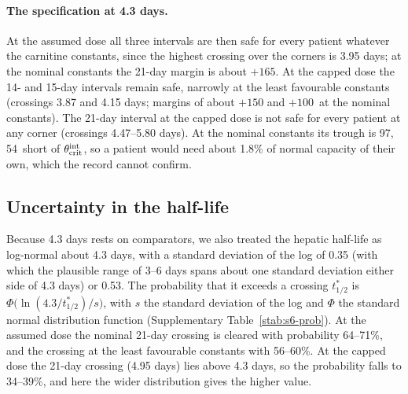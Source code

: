 \paragraph{The specification at 4.3 days.} At the assumed dose all three intervals are then safe
for every patient whatever the carnitine constants, since the highest crossing over the corners
is 3.95 days; at the nominal constants the 21-day margin is about $+165$\um. At the capped dose
the 14- and 15-day intervals remain safe, narrowly at the least favourable constants (crossings
3.87 and 4.15 days; margins of about $+150$ and $+100$\um\ at the nominal constants). The 21-day
interval at the capped dose is not safe for every patient at any corner (crossings 4.47--5.80
days). At the nominal constants its trough is 97\um, 54\um\ short of $\theta_{\mathrm{crit}}^{\mathrm{int}}$, so a patient would
need about 1.8\% of normal capacity of their own, which the record cannot confirm.

\subsection{Uncertainty in the half-life}
\label{si:s6:prob}

Because 4.3 days rests on comparators, we also treated the hepatic half-life as log-normal
about 4.3 days, with a standard deviation of the log of 0.35 (with which the plausible range of
3--6 days spans about one standard deviation either side of 4.3 days) or 0.53. The probability
that it exceeds a crossing $t_{1/2}^{\ast}$ is $\Phi\bigl(\ln(4.3/t_{1/2}^{\ast})/s\bigr)$, with $s$
the standard deviation of the log and $\Phi$ the standard normal distribution function
(Supplementary Table~\ref{stab:s6-prob}). At the assumed dose the nominal 21-day crossing is
cleared with probability 64--71\%, and the crossing at the least favourable constants with
56--60\%. At the capped dose the 21-day crossing (4.95 days) lies above 4.3 days, so the
probability falls to 34--39\%, and here the wider distribution gives the higher value.

